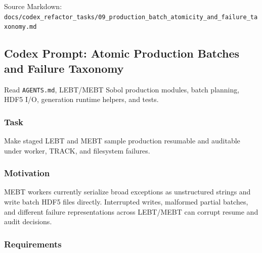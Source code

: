 \documentclass[
]{article}
\begin{document}
Source Markdown:
\texttt{docs/codex\_refactor\_tasks/09\_production\_batch\_atomicity\_and\_failure\_taxonomy.md}

\hypertarget{codex-prompt-atomic-production-batches-and-failure-taxonomy}{%
\subsection{Codex Prompt: Atomic Production Batches and Failure
Taxonomy}\label{codex-prompt-atomic-production-batches-and-failure-taxonomy}}

Read \texttt{AGENTS.md}, LEBT/MEBT Sobol production modules, batch
planning, HDF5 I/O, generation runtime helpers, and tests.

\hypertarget{task-8}{%
\subsubsection{Task}\label{task-8}}

Make staged LEBT and MEBT sample production resumable and auditable
under worker, TRACK, and filesystem failures.

\hypertarget{motivation-2}{%
\subsubsection{Motivation}\label{motivation-2}}

MEBT workers currently serialize broad exceptions as unstructured
strings and write batch HDF5 files directly. Interrupted writes,
malformed partial batches, and different failure representations across
LEBT/MEBT can corrupt resume and audit decisions.

\hypertarget{requirements-8}{%
\subsubsection{Requirements}\label{requirements-8}}
\end{document}
